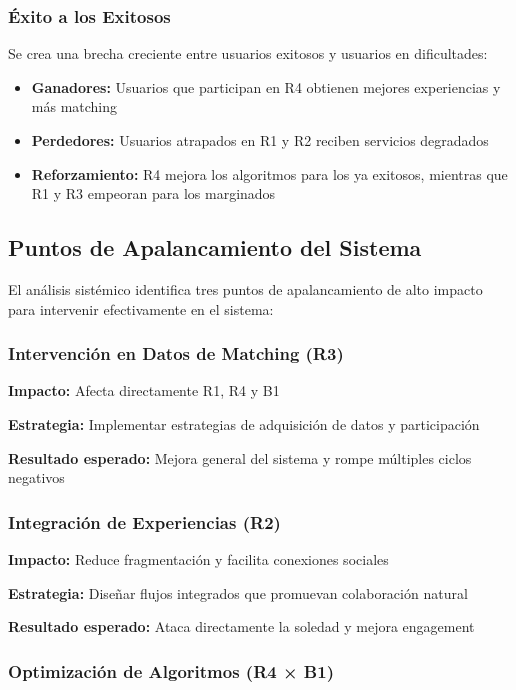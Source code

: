 \documentclass[12pt, letterpaper]{article}
\begin{document}
\subsubsection{Éxito a los Exitosos}

Se crea una brecha creciente entre usuarios exitosos y usuarios en dificultades:

\begin{itemize}
\item \textbf{Ganadores:} Usuarios que participan en R4 obtienen mejores experiencias y más matching
\item \textbf{Perdedores:} Usuarios atrapados en R1 y R2 reciben servicios degradados
\item \textbf{Reforzamiento:} R4 mejora los algoritmos para los ya exitosos, mientras que R1 y R3 empeoran para los marginados
\end{itemize}

\subsection{Puntos de Apalancamiento del Sistema}

El análisis sistémico identifica tres puntos de apalancamiento de alto impacto para intervenir efectivamente en el sistema:

\subsubsection{Intervención en Datos de Matching (R3)}

\textbf{Impacto:} Afecta directamente R1, R4 y B1

\textbf{Estrategia:} Implementar estrategias de adquisición de datos y participación

\textbf{Resultado esperado:} Mejora general del sistema y rompe múltiples ciclos negativos

\subsubsection{Integración de Experiencias (R2)}

\textbf{Impacto:} Reduce fragmentación y facilita conexiones sociales

\textbf{Estrategia:} Diseñar flujos integrados que promuevan colaboración natural

\textbf{Resultado esperado:} Ataca directamente la soledad y mejora engagement

\subsubsection{Optimización de Algoritmos (R4 × B1)}
\end{document}
